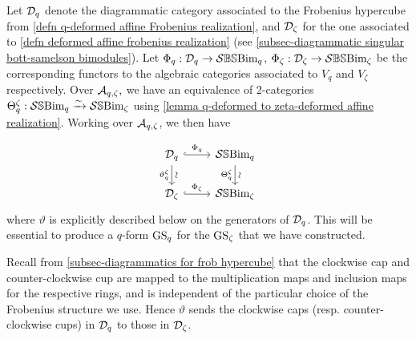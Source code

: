
Let $\mathcal{D}_q$ denote the diagrammatic category associated to the Frobenius hypercube from \cref{defn q-deformed affine Frobenius realization}, and $\mathcal{D}_\zeta$ for the one associated to \cref{defn deformed affine frobenius realization} (see \cref{subsec-diagrammatic singular bott-samelson bimodules}).
Let $\Phi_q: \mathcal{D}_q \rightarrow \mathcal{S}\mathbb{BS}\text{Bim}_q$, $\Phi_\zeta: \mathcal{D}_\zeta \rightarrow \mathcal{S}\mathbb{BS}\text{Bim}_\zeta$ be the corresponding functors to the algebraic categories associated to $V_q$ and $V_\zeta$ respectively. Over $\mathcal{A}_{q,\zeta},$ we have an equivalence of 2-categories $\Theta^\zeta_q:\mathcal{S}\mathbb{S}\text{Bim}_q\xrightarrow{\sim}\mathcal{S}\mathbb{S}\text{Bim}_\zeta$ using \cref{lemma q-deformed to zeta-deformed affine realization}.
Working over $\mathcal{A}_{q,\zeta}$, we then have

\begin{equation}
\begin{tikzcd}
    \qdiag \arrow[r, hook, "\Phi_q"] \arrow[d, "\sim" sloped, "\vartheta_q^\zeta"'] & \SSBim_q \arrow[d, "\sim" sloped , "\Theta^\zeta_q"'] \\
    \zdiag \arrow[r, hook, "\Phi_\zeta"] & \SSBim_\zeta
\end{tikzcd}
\end{equation}
where $\vartheta$ is explicitly described below on the generators of $\mathcal{D}_q$. This will be essential to produce a $q$-form $\operatorname{GS}_q$ for the $\operatorname{GS}_\zeta$ that we have constructed.

Recall from \cref{subsec-diagrammatics for frob hypercube} that the clockwise cap and counter-clockwise cup are mapped to the multiplication maps and inclusion maps for the respective rings, and is independent of the particular choice of the Frobenius structure we use.
Hence $\vartheta$ sends the clockwise caps (resp. counter-clockwise cups) in $\mathcal{D}_q$ to those in $\mathcal{D}_\zeta$.

